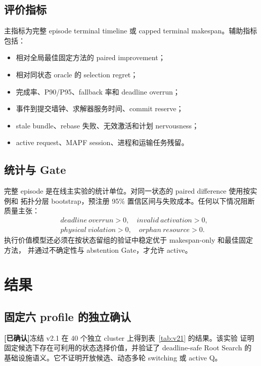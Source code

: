 \documentclass[11pt,a4paper]{article}
\newcommand{\confirmed}{\textcolor{green!45!black}{\textbf{[已确认]}}}
\begin{document}
\subsection{评价指标}

主指标为完整 episode terminal timeline 或 capped terminal makespan。辅助指标包括：
\begin{itemize}
    \item 相对全局最佳固定方法的 paired improvement；
    \item 相对同状态 oracle 的 selection regret；
    \item 完成率、P90/P95、fallback 率和 deadline overrun；
    \item 事件到提交墙钟、求解器服务时间、commit reserve；
    \item stale bundle、rebase 失败、无效激活和计划 nervousness；
    \item active request、MAPF session、进程和运输任务残留。
\end{itemize}

\subsection{统计与 Gate}

完整 episode 是在线主实验的统计单位。对同一状态的 paired difference 使用按实例和
拓扑分层 bootstrap，预注册 95\% 置信区间与失败成本。任何以下情况阻断质量主张：
\begin{equation}
\begin{split}
    &deadline\ overrun > 0,\quad invalid\ activation > 0,\\
    &physical\ violation > 0,\quad orphan\ resource > 0.
\end{split}
\end{equation}
执行价值模型还必须在按状态留组的验证中稳定优于 makespan-only 和最佳固定方法，
并通过不确定性与 abstention Gate，才允许 active。

\section{结果}
\label{sec:results}

\subsection{固定六 profile 的独立确认}

\confirmed 冻结 v2.1 在 40 个独立 cluster 上得到表~\ref{tab:v21} 的结果。该实验
证明固定候选下存在可利用的状态选择价值，并验证了 deadline-safe Root Search 的
基础设施语义。它不证明开放候选、动态多轮 switching 或 active Q。
\end{document}
